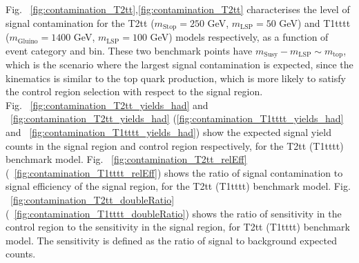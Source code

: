 Fig. ~\ref{fig:contamination_T2tt},\ref{fig:contamination_T2tt} characterises the level of signal
contamination for the T2tt ($m_{\mathrm{Stop}}=250$ GeV, $m_{\mathrm{LSP}}=50$ GeV) and 
T1tttt ($m_{\mathrm{Gluino}}=1400$ GeV, $m_{\mathrm{LSP}}=100$ GeV) models respectively, as a function of event category and
\scalht bin.
These two benchmark points have $m_{\mathrm{Susy}}-m_{\mathrm{LSP}} \sim m_{\mathrm{top}}$, which is the scenario 
where the largest signal contamination is expected, since the kinematics is similar to 
the top quark production, which is more likely to satisfy the control region selection with respect to the signal region. \\
Fig. ~\ref{fig:contamination_T2tt_yields_had} and ~\ref{fig:contamination_T2tt_yields_had} (\ref{fig:contamination_T1tttt_yields_had} and ~\ref{fig:contamination_T1tttt_yields_had}) show the
expected signal yield counts in the signal region and \mj control region respectively, for the T2tt (T1tttt) benchmark model. 
Fig. ~\ref{fig:contamination_T2tt_relEff} (~\ref{fig:contamination_T1tttt_relEff}) shows the ratio of signal contamination to signal efficiency of the signal region, for the T2tt (T1tttt) benchmark model. 
Fig. ~\ref{fig:contamination_T2tt_doubleRatio} (~\ref{fig:contamination_T1tttt_doubleRatio}) shows the ratio of sensitivity in the control region to the sensitivity in the signal region, for T2tt (T1tttt) benchmark model. The sensitivity is defined as the ratio of signal to background expected counts. 

